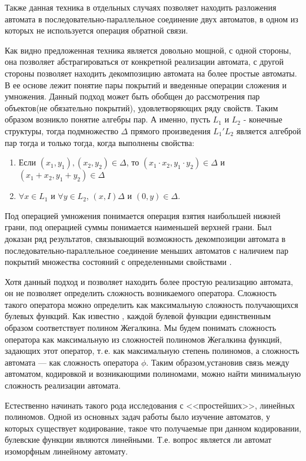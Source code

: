 Также данная техника в отдельных случаях позволяет находить разложения автомата в последовательно-параллельное соединение двух автоматов, в одном из которых не используется операция обратной связи.

Как видно предложенная техника является довольно мощной, с одной стороны, она позволяет абстрагироваться от конкретной реализации автомата, с другой стороны позволяет находить декомпозицию автомата на более простые автоматы. В ее основе лежит понятие пары покрытий и введенные операции сложения и умножения. Данный подход может быть обобщен до рассмотрения пар объектов(не обязательно покрытий), удовлетворяющих ряду свойств. Таким образом возникло понятие алгебры пар. А именно, пусть $L_1$ и $L_2$ - конечные структуры, тогда подмножество $\Delta$ прямого произведения $L_1\prime L_2$ является алгеброй пар тогда и только тогда, когда выполнены свойства:
\begin{enumerate}
\item Если $(x_1,y_1),(x_2,y_2)\in\Delta$, то $(x_1\cdot x_2,y_1\cdot y_2)\in \Delta$ и $(x_1+x_2,y_1+y_2)\in \Delta$
\item $\forall x\in L_1$ и $\forall y\in L_2$, $(x,I)\Delta$ и $(0,y)\in\Delta$.
\end{enumerate}
Под операцией умножения понимается операция взятия наибольшей нижней грани, под операцией суммы понимается наименьшей верхней грани.
Был доказан ряд результатов, связывающий возможность декомпозиции автомата в последовательно-параллельное соединение меньших автоматов с наличием пар покрытий множества состояний с определенными свойствами \cite{stearns_hartmanis_main_ru}.

Хотя данный подход и позволяет находить более простую реализацию автомата, он не позволяет определить сложность возникаемого оператора. Сложность такого оператора можно определить как максимальную сложность получающихся булевых функций. Как известно \cite{Yablonski}, каждой булевой функции единственным образом
соответствует полином Жегалкина. Мы будем понимать сложность оператора как максимальную из сложностей полиномов Жегалкина функций, задающих этот оператор, т.\,е. как максимальную степень полиномов, а сложность автомата --- как сложность оператора $\phi$. Таким образом,установив связь между автоматом, кодировкой и возникающими полиномами, можно найти минимальную сложность реализации автомата.

\par Естественно начинать такого рода исследования с <<простейших>>, линейных полиномов. Одной из основных задач работы было изучение автоматов, у которых существует кодирование, такое что получаемые при данном кодировании, булевские функции являются линейными. Т.е. вопрос является ли автомат изоморфным линейному автомату. 

